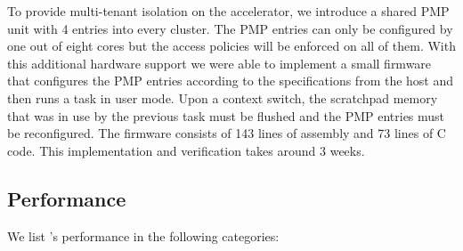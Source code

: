 To provide multi-tenant isolation on the accelerator, we introduce a shared PMP unit with 4 entries into every cluster. The PMP entries can only be configured by one out of eight cores but the access policies will be enforced on all of them. With this additional hardware support we were able to implement a small firmware that configures the PMP entries according to the specifications from the host and then runs a task in user mode. Upon a context switch, the scratchpad memory that was in use by the previous task must be flushed and the PMP entries must be reconfigured. The firmware consists of 143 lines of assembly and 73 lines of C code. This implementation and verification takes around 3 weeks.

\subsection{Performance}
\label{sec:eval:numbers}
We list \name{}'s performance in the following categories:





